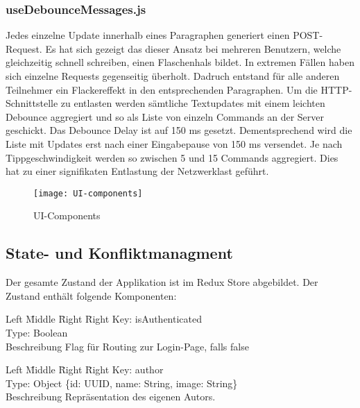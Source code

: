 \subsubsection*{useDebounceMessages.js}
Jedes einzelne Update innerhalb eines Paragraphen generiert einen POST-Request.
Es hat sich gezeigt das dieser Ansatz bei mehreren Benutzern, welche gleichzeitig schnell schreiben, einen Flaschenhals bildet.
In extremen Fällen haben sich einzelne Requests gegenseitig überholt.
Dadruch entstand für alle anderen Teilnehmer ein Flackereffekt in den entsprechenden Paragraphen.
Um die HTTP-Schnittstelle zu entlasten werden sämtliche Textupdates mit einem leichten Debounce aggregiert und so als Liste von einzeln Commands an der Server geschickt.
Das Debounce Delay ist auf 150 ms gesetzt.
Dementsprechend wird die Liste mit Updates erst nach einer Eingabepause von 150 ms versendet.
Je nach Tippgeschwindigkeit werden so zwischen 5 und 15 Commands aggregiert.
Dies hat zu einer signifikaten Entlastung der Netzwerklast geführt.

\begin{figure}[H]
    \centering
    \texttt{[image: UI-components]}
    \caption{UI-Components}
    \label{fig: UI-Components}
\end{figure}

\subsection{State- und Konfliktmanagment}
Der gesamte Zustand der Applikation ist im Redux Store abgebildet.
Der Zustand enthält folgende Komponenten:

\begin{tabbing}
    Left \= Middle \= Right \= Right \kill
    Key:  \> \> \> isAuthenticated\\
    Type:  \> \> \> Boolean \\
    Beschreibung \>  \> \> Flag für Routing zur Login-Page, falls false\\
\end{tabbing}

\begin{tabbing}
    Left \= Middle \= Right \= Right \kill
    Key:  \> \> \> author\\
    Type:  \> \> \> Object \{id: UUID, name: String, image: String\} \\
    Beschreibung \>  \> \> Repräsentation des eigenen Autors.\\
\end{tabbing}

